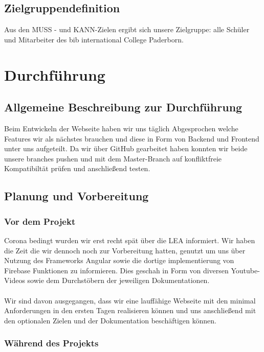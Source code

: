 \documentclass[12pt,titlepage]{article}
\begin{document}
\FloatBarrier

\subsection{Zielgruppendefinition}

Aus den MUSS - und KANN-Zielen ergibt sich unsere Zielgruppe: alle Schüler und Mitarbeiter des bib international College Paderborn. 

\newpage
\section{Durchführung}

\subsection{Allgemeine Beschreibung zur Durchführung}

Beim Entwickeln der Webseite  haben wir uns täglich Abgesprochen welche Features wir als nächstes brauchen und diese in Form von  Backend und Frontend unter uns aufgeteilt. Da wir über GitHub gearbeitet haben konnten wir beide unsere branches pushen und mit dem Master-Branch auf konfliktfreie Kompatibiltät prüfen und anschließend testen.

\subsection{Planung und Vorbereitung}

\subsubsection{Vor dem Projekt}

Corona bedingt wurden wir erst recht spät über die LEA informiert. Wir haben die Zeit die wir dennoch noch zur Vorbereitung hatten, genutzt um uns über Nutzung des Frameworks Angular sowie die dortige implementierung von Firebase Funktionen zu informieren. Dies geschah in Form von diversen Youtube-Videos sowie dem Durchstöbern der jeweiligen Dokumentationen.\\ \\
Wir sind davon ausgegangen, dass wir eine lauffähige Webseite mit den minimal Anforderungen in den ersten Tagen realisieren können und uns anschließend mit den optionalen Zielen und der Dokumentation beschäftigen können.

\subsubsection{Während des Projekts}
\end{document}
